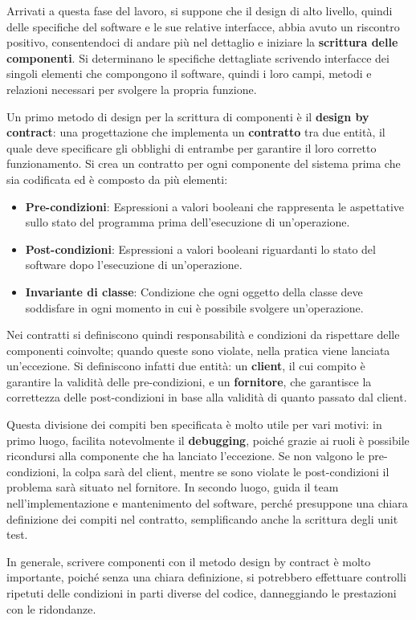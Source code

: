 \noindent Arrivati a questa fase del lavoro, si suppone che il design di alto livello, quindi delle specifiche del software e le sue relative interfacce, abbia avuto un riscontro positivo, consentendoci di andare più nel dettaglio e iniziare la \textbf{scrittura delle componenti}. Si determinano le specifiche dettagliate scrivendo interfacce dei singoli elementi che compongono il software, quindi i loro campi, metodi e relazioni necessari per svolgere la propria funzione.\par
Un primo metodo di design per la scrittura di componenti è il \textbf{design by contract}: una progettazione che implementa un \textbf{contratto} tra due entità, il quale deve specificare gli obblighi di entrambe per garantire il loro corretto funzionamento. Si crea un contratto per ogni componente del sistema prima che sia codificata ed è composto da più elementi: \begin{itemize}
	\item \textbf{Pre-condizioni}: Espressioni a valori booleani che rappresenta le aspettative sullo stato del programma prima dell'esecuzione di un'operazione.
	\item \textbf{Post-condizioni}: Espressioni a valori booleani riguardanti lo stato del software dopo l'esecuzione di un'operazione.
	\item \textbf{Invariante di classe}: Condizione che ogni oggetto della classe deve soddisfare in ogni momento in cui è possibile svolgere un'operazione.
\end{itemize}
\noindent Nei contratti si definiscono quindi responsabilità e condizioni da rispettare delle componenti coinvolte; quando queste sono violate, nella pratica viene lanciata un'eccezione. Si definiscono infatti due entità: un \textbf{client}, il cui compito è garantire la validità delle pre-condizioni, e un \textbf{fornitore}, che garantisce la correttezza delle post-condizioni in base alla validità di quanto passato dal client.\par
Questa divisione dei compiti ben specificata è molto utile per vari motivi: in primo luogo, facilita notevolmente il \textbf{debugging}, poiché grazie ai ruoli è possibile ricondursi alla componente che ha lanciato l'eccezione. Se non valgono le pre-condizioni, la colpa sarà del client, mentre se sono violate le post-condizioni il problema sarà situato nel fornitore. In secondo luogo, guida il team nell'implementazione e mantenimento del software, perché presuppone una chiara definizione dei compiti nel contratto, semplificando anche la scrittura degli unit test.\par
In generale, scrivere componenti con il metodo design by contract è molto importante, poiché senza una chiara definizione, si potrebbero effettuare controlli ripetuti delle condizioni in parti diverse del codice, danneggiando le prestazioni con le ridondanze.

